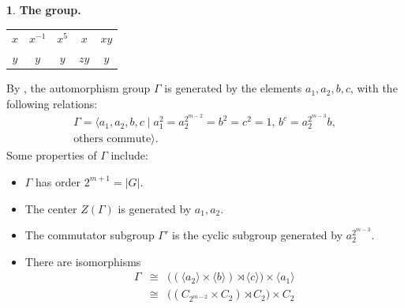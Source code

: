 \documentclass[12pt]{article}
\theoremstyle{plain}
\theoremstyle{definition}
\newtheorem{nothing}[theorem]{}
\begin{document}
\begin{nothing} {\textbf{The group.}}
\begin{center}
\begin{tabular}{c|cccc}
         $x$ & $x^{-1}$ & $x^5$ & $x$ & $xy$\\
         $y$ & $y$ & $y$ & $zy$ & $y$\\
    \end{tabular}
\end{center}
By \cite[Section 3]{BC}, the automorphism group \(\Gamma\) is generated by the elements \(a_1, a_2, b, c\), with the following relations:
\begin{align*}
\Gamma = \langle a_1, a_2, b, c \mid a_1^2 = a_2^{2^{m-2}} = b^2 = c^2 = 1, \, b^c = a_2^{2^{m-3}} b,\\ \text{others commute} \rangle.
\end{align*}
Some properties of \(\Gamma\) include:
\begin{itemize}
    \item \(\Gamma\) has order \(2^{m+1} = |G|\).
    \item The center \(Z(\Gamma)\) is generated by \(a_1, a_2\).
    \item The commutator subgroup \(\Gamma'\) is the cyclic subgroup generated by \(a_2^{2^{m-3}}\).
    \item There are isomorphisms \begin{eqnarray*}
\Gamma 
&\cong& \big( (\langle a_2\rangle \times \langle b\rangle)\rtimes \langle c\rangle \big) \times \langle a_1\rangle \\
&\cong & \big( (C_{2^{m-2}}\times C_2)\rtimes C_2 \big) \times C_2 
\end{eqnarray*}
\end{itemize}

\end{nothing}
\end{document}
